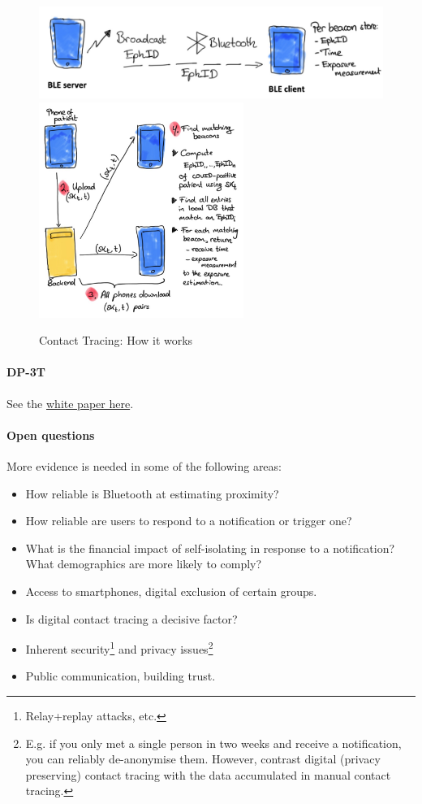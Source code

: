 \begin{figure}[h]
	\centering
	\includegraphics[width=12cm]{images/11-cont-trac-beac.png}
	\includegraphics[height=7cm]{images/11-cont-trac-up.png}
	\caption{Contact Tracing: How it works}
	\label{fig:how-tracing}
\end{figure}

\paragraph{DP-3T}
See the
\href{https://github.com/DP-3T/documents/blob/master/DP3T\%20White\%20Paper.pdf}{white
	paper here}.

\paragraph{Open questions}
More evidence is needed in some of the following areas:
\begin{itemize}
	\item How reliable is Bluetooth at estimating proximity?
	\item How reliable are users to respond to a notification or trigger one?
	\item What is the financial impact of self-isolating in response to a notification?
	      What demographics are more likely to comply?
	\item Access to smartphones, digital exclusion of certain groups.
	\item Is digital contact tracing a decisive factor?
	\item Inherent security\footnote{Relay+replay attacks, etc.} and privacy
	      issues\footnote{E.g. if you only met a single person in two weeks and receive a
		      notification, you can reliably de-anonymise them. However, contrast digital
		      (privacy preserving) contact tracing with the data accumulated in manual
		      contact tracing.}
	\item Public communication, building trust.
\end{itemize}